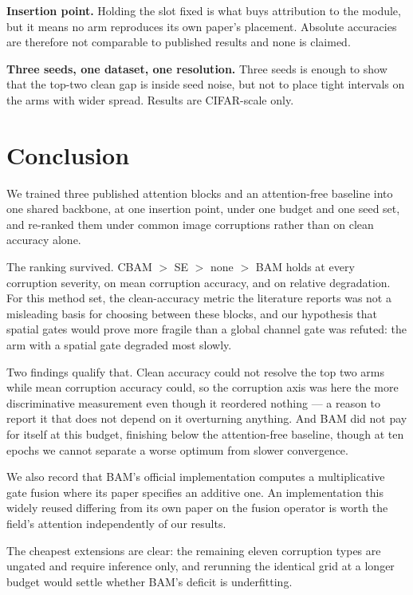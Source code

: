 \documentclass[10pt]{article}
\begin{document}
\textbf{Insertion point.} Holding the slot fixed is what buys attribution to the
module, but it means no arm reproduces its own paper's placement. Absolute
accuracies are therefore not comparable to published results and none is
claimed.

\textbf{Three seeds, one dataset, one resolution.} Three seeds is enough to show
that the top-two clean gap is inside seed noise, but not to place tight
intervals on the arms with wider spread. Results are CIFAR-scale only.

\section{Conclusion}
\label{sec:conclusion}

We trained three published attention blocks and an attention-free baseline into
one shared backbone, at one insertion point, under one budget and one seed set,
and re-ranked them under common image corruptions rather than on clean accuracy
alone.

The ranking survived. CBAM $>$ SE $>$ none $>$ BAM holds at every corruption
severity, on mean corruption accuracy, and on relative degradation. For this
method set, the clean-accuracy metric the literature reports was not a
misleading basis for choosing between these blocks, and our hypothesis that
spatial gates would prove more fragile than a global channel gate was refuted:
the arm with a spatial gate degraded most slowly.

Two findings qualify that. Clean accuracy could not resolve the top two arms
while mean corruption accuracy could, so the corruption axis was here the more
discriminative measurement even though it reordered nothing --- a reason to
report it that does not depend on it overturning anything. And BAM did not pay
for itself at this budget, finishing below the attention-free baseline, though
at ten epochs we cannot separate a worse optimum from slower convergence.

We also record that BAM's official implementation computes a multiplicative gate
fusion where its paper specifies an additive one. An implementation this widely
reused differing from its own paper on the fusion operator is worth the
field's attention independently of our results.

The cheapest extensions are clear: the remaining eleven corruption types are
ungated and require inference only, and rerunning the identical grid at a longer
budget would settle whether BAM's deficit is underfitting.



\end{document}
